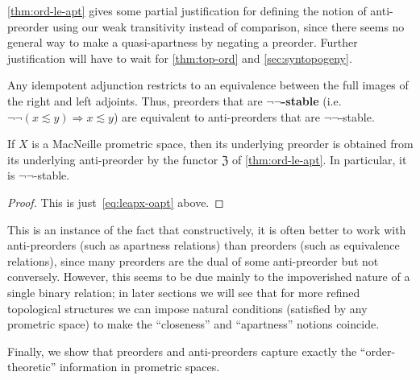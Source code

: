 \documentclass{article}
\def\leapx{\lesssim}
\let\implies\Rightarrow
\def\neigh{\mathfrak{Z}}
\def\nn{\ensuremath{\neg\neg}}
\begin{document}
\cref{thm:ord-le-apt} gives some partial justification for defining the notion of anti-preorder using our weak transitivity instead of comparison, since there seems no general way to make a quasi-apartness by negating a preorder.
Further justification will have to wait for \cref{thm:top-ord} and \cref{sec:syntopogeny}.

Any idempotent adjunction restricts to an equivalence between the full images of the right and left adjoints.
Thus, preorders that are \textbf{\nn-stable} (i.e.\ $\neg\neg(x\leapx y) \implies x\leapx y$) are equivalent to anti-preorders that are \nn-stable.

\begin{thm}\label{thm:macneille-preord}
  If $X$ is a MacNeille prometric space, then its underlying preorder is obtained from its underlying anti-preorder by the functor $\neigh$ of \cref{thm:ord-le-apt}.
  In particular, it is \nn-stable.
\end{thm}
\begin{proof}
  This is just~\eqref{eq:leapx-oapt} above.
\end{proof}

This is an instance of the fact that constructively, it is often better to work with anti-preorders (such as apartness relations) than preorders (such as equivalence relations), since many preorders are the dual of some anti-preorder but not conversely.
However, this seems to be due mainly to the impoverished nature of a single binary relation; in later sections we will see that for more refined topological structures we can impose natural conditions (satisfied by any prometric space) to make the ``closeness'' and ``apartness'' notions coincide.

Finally, we show that preorders and anti-preorders capture exactly the ``order-theoretic'' information in prometric spaces.
\end{document}
